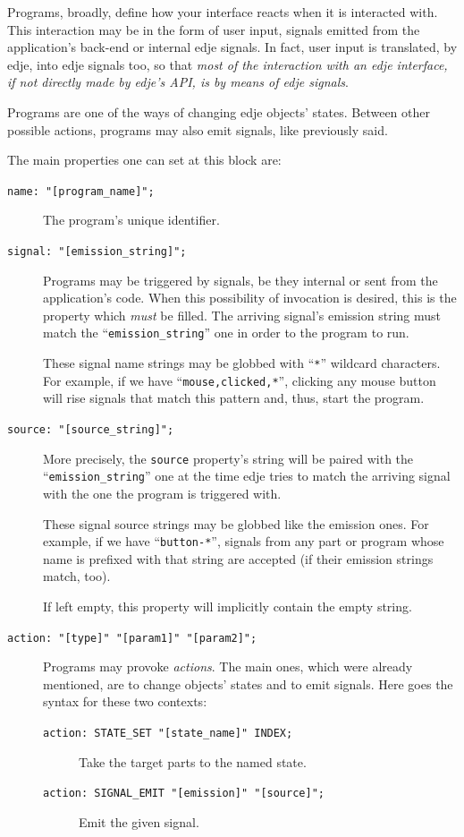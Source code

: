 \documentclass[a4paper]{profusion}
\begin{document}
Programs, broadly, define how your interface reacts when it is
interacted with.  This interaction may be in the form of user input,
signals emitted from the application's back-end or internal edje
signals. In fact, user input is translated, by edje, into edje signals
too, so that \emph{most of the interaction with an edje interface, if
  not directly made by edje's API, is by means of edje signals}.

Programs are one of the ways of changing edje objects' states. Between
other possible actions, programs may also emit signals, like previously
said.

The main properties one can set at this block are:

\begin{description}

\item[\texttt{name: "[program\_name]";}] The program's unique
  identifier.

\item[\texttt{signal: "[emission\_string]";}] Programs may be
  triggered by signals, be they internal or sent from the
  application's code. When this possibility of invocation is desired,
  this is the property which \emph{must} be filled.  The arriving
  signal's emission string must match the
  ``\texttt{emission\_string}'' one in order to the program to run.

  These signal name strings may be globbed with ``\texttt{*}''
  wildcard characters. For example, if we have
  ``\texttt{mouse,clicked,*}'', clicking any mouse button will rise
  signals that match this pattern and, thus, start the program.

\item[\texttt{source: "[source\_string]";}] More precisely, the
  \texttt{source} property's string will be paired with the
  ``\texttt{emission\_string}'' one at the time edje tries to match
  the arriving signal with the one the program is triggered with.

  These signal source strings may be globbed like the emission
  ones. For example, if we have ``\texttt{button-*}'', signals from
  any part or program whose name is prefixed with that string are
  accepted (if their emission strings match, too).

  If left empty, this property will implicitly contain the empty
  string.

\item[\texttt{action: "[type]" "[param1]" "[param2]";}] Programs may
  provoke \emph{actions}. The main ones, which were already mentioned,
  are to change objects' states and to emit signals. Here goes the
  syntax for these two contexts:
  \begin{description}
    \item[\texttt{action: STATE\_SET "[state\_name]" INDEX;}] Take the
      target parts to the named state.
    \item[\texttt{action: SIGNAL\_EMIT "[emission]" "[source]";}] Emit
      the given signal.
  \end{description}


\end{description}
\end{document}
